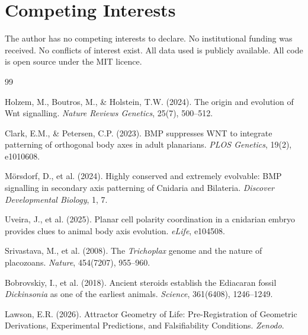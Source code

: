 \documentclass[12pt, a4paper]{article}
\theoremstyle{definition}
\theoremstyle{remark}
\begin{document}
\section*{Competing Interests}

The author has no competing interests to declare. No
institutional funding was received. No conflicts of
interest exist. All data used is publicly available.
All code is open source under the MIT licence.

\newpage

\begin{thebibliography}{99}

Holzem, M., Boutros, M., \& Holstein, T.W. (2024).
The origin and evolution of Wnt signalling.
\textit{Nature Reviews Genetics}, 25(7), 500--512.

Clark, E.M., \& Petersen, C.P. (2023).
BMP suppresses WNT to integrate patterning of
orthogonal body axes in adult planarians.
\textit{PLOS Genetics}, 19(2), e1010608.

M\"{o}rsdorf, D., et al. (2024).
Highly conserved and extremely evolvable: BMP
signalling in secondary axis patterning of
Cnidaria and Bilateria.
\textit{Discover Developmental Biology}, 1, 7.

Uveira, J., et al. (2025).
Planar cell polarity coordination in a cnidarian
embryo provides clues to animal body axis evolution.
\textit{eLife}, e104508.

Srivastava, M., et al. (2008).
The \textit{Trichoplax} genome and the nature of
placozoans.
\textit{Nature}, 454(7207), 955--960.

Bobrovskiy, I., et al. (2018).
Ancient steroids establish the Ediacaran fossil
\textit{Dickinsonia} as one of the earliest animals.
\textit{Science}, 361(6408), 1246--1249.

Lawson, E.R. (2026).
Attractor Geometry of Life: Pre-Registration of
Geometric Derivations, Experimental Predictions,
and Falsifiability Conditions.
\textit{Zenodo}.


\end{thebibliography}
\end{document}

